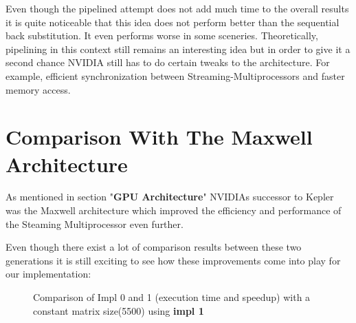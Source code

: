 \documentclass[draft, final]{vutinfth} %
\begin{document}
			Even though the pipelined attempt does not add much time to the overall results it is quite noticeable that this idea does not perform better than the sequential back substitution. It even performs worse in some sceneries. Theoretically, pipelining in this context still remains an interesting idea but in order to give it a second chance NVIDIA still has to do certain tweaks to the architecture. For example, efficient synchronization between Streaming-Multiprocessors and faster memory access.

		\section{Comparison With The Maxwell Architecture}
			As mentioned in section "\textbf{GPU Architecture}" NVIDIAs successor to Kepler was the Maxwell architecture which improved the efficiency and performance of the Steaming Multiprocessor even further.

			Even though there exist a lot of comparison results between these two generations it is still exciting to see how these improvements come into play for our implementation:

			\begin{figure}[!ht]
				\centering
				\begin{subfigure}[t]{2\textwidth}
				\end{subfigure}
				\caption{Comparison of Impl 0 and 1 (execution time and speedup) with a constant matrix size(5500) using \textbf{impl 1}}
			\end{figure}
\end{document}

